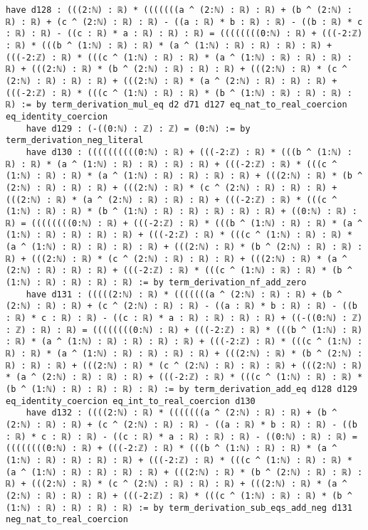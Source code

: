 \documentclass{article}
\begin{document}
\begin{tcolorbox}[colback=white!10, width=\linewidth]
\begin{lstlisting}[language=Lean4]
    have d128 : (((2:ℕ) : ℝ) * (((((((a ^ (2:ℕ) : ℝ) : ℝ) + (b ^ (2:ℕ) : ℝ) : ℝ) + (c ^ (2:ℕ) : ℝ) : ℝ) - ((a : ℝ) * b : ℝ) : ℝ) - ((b : ℝ) * c : ℝ) : ℝ) - ((c : ℝ) * a : ℝ) : ℝ) : ℝ) = ((((((((0:ℕ) : ℝ) + (((-2:ℤ) : ℝ) * (((b ^ (1:ℕ) : ℝ) : ℝ) * (a ^ (1:ℕ) : ℝ) : ℝ) : ℝ) : ℝ) + (((-2:ℤ) : ℝ) * (((c ^ (1:ℕ) : ℝ) : ℝ) * (a ^ (1:ℕ) : ℝ) : ℝ) : ℝ) : ℝ) + (((2:ℕ) : ℝ) * (b ^ (2:ℕ) : ℝ) : ℝ) : ℝ) + (((2:ℕ) : ℝ) * (c ^ (2:ℕ) : ℝ) : ℝ) : ℝ) + (((2:ℕ) : ℝ) * (a ^ (2:ℕ) : ℝ) : ℝ) : ℝ) + (((-2:ℤ) : ℝ) * (((c ^ (1:ℕ) : ℝ) : ℝ) * (b ^ (1:ℕ) : ℝ) : ℝ) : ℝ) : ℝ) := by term_derivation_mul_eq d2 d71 d127 eq_nat_to_real_coercion eq_identity_coercion
    have d129 : (-((0:ℕ) : ℤ) : ℤ) = (0:ℕ) := by term_derivation_neg_literal
    have d130 : ((((((((((0:ℕ) : ℝ) + (((-2:ℤ) : ℝ) * (((b ^ (1:ℕ) : ℝ) : ℝ) * (a ^ (1:ℕ) : ℝ) : ℝ) : ℝ) : ℝ) + (((-2:ℤ) : ℝ) * (((c ^ (1:ℕ) : ℝ) : ℝ) * (a ^ (1:ℕ) : ℝ) : ℝ) : ℝ) : ℝ) + (((2:ℕ) : ℝ) * (b ^ (2:ℕ) : ℝ) : ℝ) : ℝ) + (((2:ℕ) : ℝ) * (c ^ (2:ℕ) : ℝ) : ℝ) : ℝ) + (((2:ℕ) : ℝ) * (a ^ (2:ℕ) : ℝ) : ℝ) : ℝ) + (((-2:ℤ) : ℝ) * (((c ^ (1:ℕ) : ℝ) : ℝ) * (b ^ (1:ℕ) : ℝ) : ℝ) : ℝ) : ℝ) : ℝ) + ((0:ℕ) : ℝ) : ℝ) = ((((((((0:ℕ) : ℝ) + (((-2:ℤ) : ℝ) * (((b ^ (1:ℕ) : ℝ) : ℝ) * (a ^ (1:ℕ) : ℝ) : ℝ) : ℝ) : ℝ) + (((-2:ℤ) : ℝ) * (((c ^ (1:ℕ) : ℝ) : ℝ) * (a ^ (1:ℕ) : ℝ) : ℝ) : ℝ) : ℝ) + (((2:ℕ) : ℝ) * (b ^ (2:ℕ) : ℝ) : ℝ) : ℝ) + (((2:ℕ) : ℝ) * (c ^ (2:ℕ) : ℝ) : ℝ) : ℝ) + (((2:ℕ) : ℝ) * (a ^ (2:ℕ) : ℝ) : ℝ) : ℝ) + (((-2:ℤ) : ℝ) * (((c ^ (1:ℕ) : ℝ) : ℝ) * (b ^ (1:ℕ) : ℝ) : ℝ) : ℝ) : ℝ) := by term_derivation_nf_add_zero
    have d131 : (((((2:ℕ) : ℝ) * (((((((a ^ (2:ℕ) : ℝ) : ℝ) + (b ^ (2:ℕ) : ℝ) : ℝ) + (c ^ (2:ℕ) : ℝ) : ℝ) - ((a : ℝ) * b : ℝ) : ℝ) - ((b : ℝ) * c : ℝ) : ℝ) - ((c : ℝ) * a : ℝ) : ℝ) : ℝ) : ℝ) + ((-((0:ℕ) : ℤ) : ℤ) : ℝ) : ℝ) = ((((((((0:ℕ) : ℝ) + (((-2:ℤ) : ℝ) * (((b ^ (1:ℕ) : ℝ) : ℝ) * (a ^ (1:ℕ) : ℝ) : ℝ) : ℝ) : ℝ) + (((-2:ℤ) : ℝ) * (((c ^ (1:ℕ) : ℝ) : ℝ) * (a ^ (1:ℕ) : ℝ) : ℝ) : ℝ) : ℝ) + (((2:ℕ) : ℝ) * (b ^ (2:ℕ) : ℝ) : ℝ) : ℝ) + (((2:ℕ) : ℝ) * (c ^ (2:ℕ) : ℝ) : ℝ) : ℝ) + (((2:ℕ) : ℝ) * (a ^ (2:ℕ) : ℝ) : ℝ) : ℝ) + (((-2:ℤ) : ℝ) * (((c ^ (1:ℕ) : ℝ) : ℝ) * (b ^ (1:ℕ) : ℝ) : ℝ) : ℝ) : ℝ) := by term_derivation_add_eq d128 d129 eq_identity_coercion eq_int_to_real_coercion d130
    have d132 : ((((2:ℕ) : ℝ) * (((((((a ^ (2:ℕ) : ℝ) : ℝ) + (b ^ (2:ℕ) : ℝ) : ℝ) + (c ^ (2:ℕ) : ℝ) : ℝ) - ((a : ℝ) * b : ℝ) : ℝ) - ((b : ℝ) * c : ℝ) : ℝ) - ((c : ℝ) * a : ℝ) : ℝ) : ℝ) - ((0:ℕ) : ℝ) : ℝ) = ((((((((0:ℕ) : ℝ) + (((-2:ℤ) : ℝ) * (((b ^ (1:ℕ) : ℝ) : ℝ) * (a ^ (1:ℕ) : ℝ) : ℝ) : ℝ) : ℝ) + (((-2:ℤ) : ℝ) * (((c ^ (1:ℕ) : ℝ) : ℝ) * (a ^ (1:ℕ) : ℝ) : ℝ) : ℝ) : ℝ) + (((2:ℕ) : ℝ) * (b ^ (2:ℕ) : ℝ) : ℝ) : ℝ) + (((2:ℕ) : ℝ) * (c ^ (2:ℕ) : ℝ) : ℝ) : ℝ) + (((2:ℕ) : ℝ) * (a ^ (2:ℕ) : ℝ) : ℝ) : ℝ) + (((-2:ℤ) : ℝ) * (((c ^ (1:ℕ) : ℝ) : ℝ) * (b ^ (1:ℕ) : ℝ) : ℝ) : ℝ) : ℝ) := by term_derivation_sub_eqs_add_neg d131 neg_nat_to_real_coercion

\end{lstlisting}
\end{tcolorbox}
\end{document}
